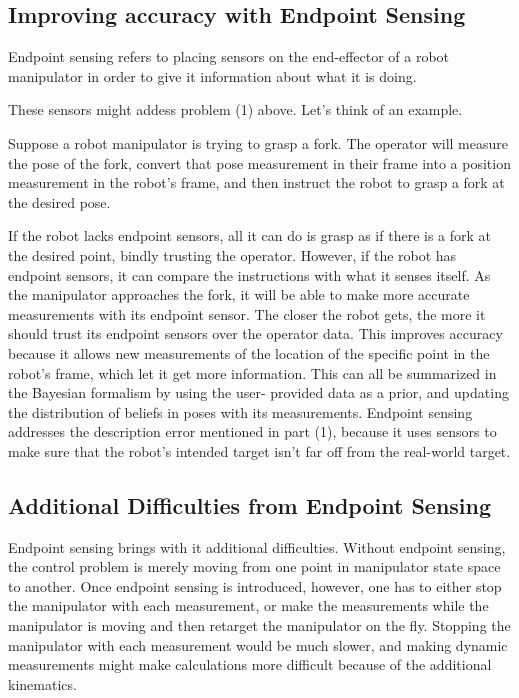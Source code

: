 \documentclass{article}
\begin{document}
\subsection{Improving accuracy with Endpoint Sensing}

Endpoint sensing refers to placing sensors on the end-effector of 
	a robot manipulator in order to give it information about
	what it is doing.

These sensors might addess problem (1) above.
Let's think of an example.

Suppose a robot manipulator is trying to grasp a fork.
The operator will measure the pose of the fork, convert that pose
	measurement in their frame into a position measurement in the
	robot's frame, and then instruct the robot to grasp
	a fork at the desired pose.

If the robot lacks endpoint sensors, all it can do is grasp as if
	there is a fork at the desired point, bindly trusting the operator.
However, if the robot has endpoint sensors, it can compare the 
	instructions with what it senses itself.
As the manipulator approaches the fork, it will be able to make 
	more accurate measurements with its endpoint sensor.
The closer the robot gets, the more it should trust its endpoint
	sensors over the operator data.
This improves accuracy because it allows new measurements of the location
	of the specific point in the robot's frame, which let it get
	more information.
This can all be summarized in the Bayesian formalism by using the user-
	provided data as a prior, and updating the distribution of beliefs
	in poses with its measurements.
Endpoint sensing addresses the description error mentioned in part
	(1), because it uses sensors to make sure that the robot's intended
	target isn't far off from the real-world target.

\subsection{Additional Difficulties from Endpoint Sensing}

Endpoint sensing brings with it additional difficulties.
Without endpoint sensing, the control problem is merely moving from
	one point in manipulator state space to another.
Once endpoint sensing is introduced, however, one has to either
	stop the manipulator with each measurement,
	or make the measurements while the manipulator is moving and then
	retarget the manipulator on the fly.
Stopping the manipulator with each measurement would be much slower,
	and making dynamic measurements might make calculations more
	difficult because of the additional kinematics.
\end{document}
